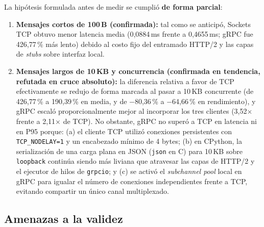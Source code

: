 \documentclass[12pt,a4paper]{article}
\begin{document}
La hipótesis formulada antes de medir se cumplió \textbf{de forma parcial}:
\begin{enumerate}
  \item \textbf{Mensajes cortos de 100\,B (confirmada):} tal como se anticipó, Sockets TCP obtuvo menor latencia media (0,0884\,ms frente a 0,4655\,ms; gRPC fue 426,77\,\% más lento) debido al costo fijo del entramado HTTP/2 y las capas de \emph{stubs} sobre interfaz local.
  \item \textbf{Mensajes largos de 10\,KB y concurrencia (confirmada en tendencia, refutada en cruce absoluto):} la diferencia relativa a favor de TCP efectivamente se redujo de forma marcada al pasar a 10\,KB concurrente (de 426,77\,\% a 190,39\,\% en media, y de $-$80,36\,\% a $-$64,66\,\% en rendimiento), y gRPC escaló proporcionalmente mejor al incorporar los tres clientes (3,52$\times$ frente a 2,11$\times$ de TCP). No obstante, gRPC no superó a TCP en latencia ni en P95 porque: (a) el cliente TCP utilizó conexiones persistentes con \texttt{TCP\_NODELAY=1} y un encabezado mínimo de 4 bytes; (b) en CPython, la serialización de una carga plana en JSON (\texttt{json} en C) para 10\,KB sobre \texttt{loopback} continúa siendo más liviana que atravesar las capas de HTTP/2 y el ejecutor de hilos de \texttt{grpcio}; y (c) se activó el \emph{subchannel pool} local en gRPC para igualar el número de conexiones independientes frente a TCP, evitando compartir un único canal multiplexado.
\end{enumerate}

\subsection{Amenazas a la validez}
\end{document}
